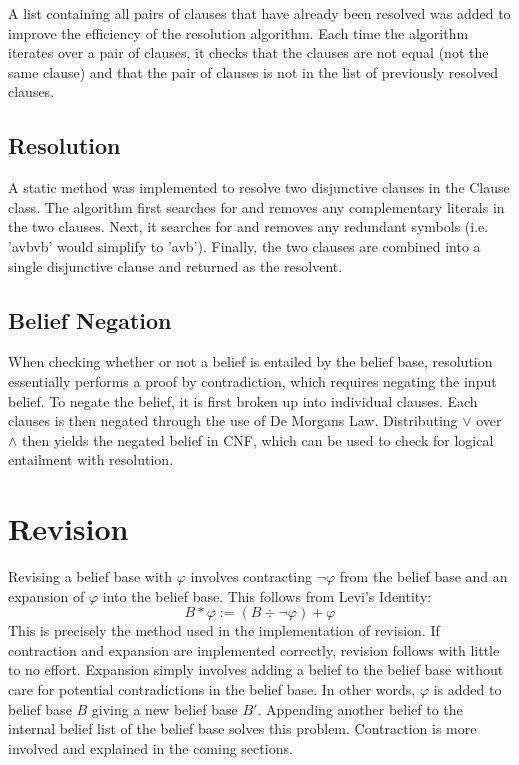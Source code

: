 \documentclass[a4paper,10pt]{article}
\begin{document}
A list containing all pairs of clauses that have already been resolved was added to improve the efficiency of the resolution algorithm. Each time the algorithm iterates over a pair of clauses, it checks that the clauses are not equal (not the same clause) and that the pair of clauses is not in the list of previously resolved clauses.

\subsection{Resolution}
\label{subsec:resolution}
A static method was implemented to resolve two disjunctive clauses in the Clause class. The algorithm first searches for and removes any complementary literals
in the two clauses. Next, it searches for and removes any redundant symbols (i.e. 'avbvb' would simplify to 'avb'). Finally, the two clauses are combined into
a single disjunctive clause and returned as the resolvent.

\subsection{Belief Negation}
\label{subsec:negation}
When checking whether or not a belief is entailed by the belief base, resolution essentially performs a proof by contradiction, which requires negating the input belief.
To negate the belief, it is first broken up into individual clauses. Each clauses is then negated through the use of De Morgans Law. Distributing $\vee$ over $\wedge$
then yields the negated belief in CNF, which can be used to check for logical entailment with resolution.

\section{Revision}
\label{sec:revision}
Revising a belief base with $\varphi$ involves contracting $\neg\varphi$ from the belief base and an expansion of $\varphi$ into the belief base. This follows from Levi's Identity:
\[B * \varphi := (B \div \neg \varphi) + \varphi\]
This is precisely the method used in the implementation of revision. If contraction and expansion are implemented correctly, revision follows with little to no effort. Expansion simply involves adding a belief to the belief base without care for potential contradictions in the belief base. In other words, $\varphi$ is added to belief base $B$ giving a new belief base $B'$. Appending another belief to the internal belief list of the belief base solves this problem. Contraction is more involved and explained in the coming sections.
\end{document}
